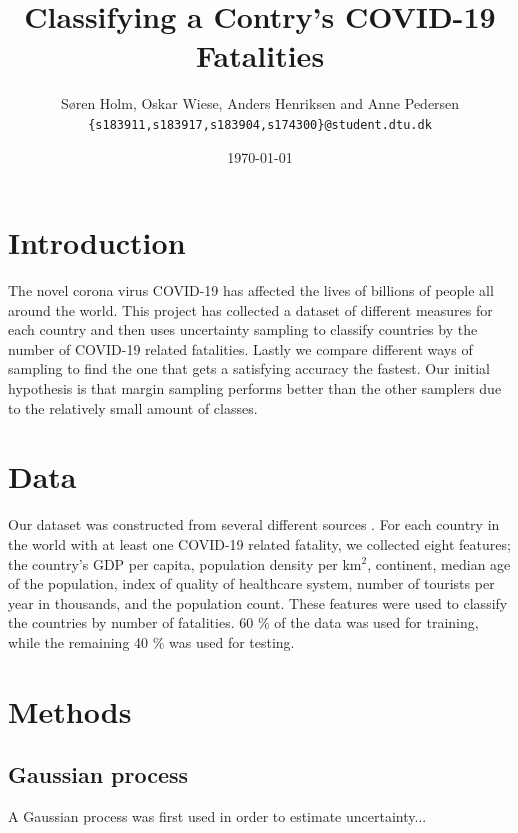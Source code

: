 \documentclass[12pt,fleqn]{article}
\title{\vspace*{-3.75cm}Classifying a Contry's COVID-19 Fatalities}
\author{Søren Holm, Oskar Wiese, Anders Henriksen and Anne Pedersen \\
	\small {\texttt{\{s183911,s183917,s183904,s174300\}@student.dtu.dk}}}
\date{\today}
\begin{document}
	
	\maketitle
	 
	
	\begin{abstract} %
		
	\end{abstract}
	
	\begin{multicols}{2}
		
		
		\section{Introduction} %
		The novel corona virus COVID-19 has affected the lives of billions of people all around the world. This project has collected a dataset of different measures for each country and then uses uncertainty sampling to classify countries by the number of COVID-19 related fatalities. Lastly we compare different ways of sampling to find the one that gets a satisfying accuracy the fastest. Our initial hypothesis is that margin sampling performs better than the other samplers due to the relatively small amount of classes. 
		
		\section{Data} 
		Our dataset was constructed from several different sources \cite{density, corona, alder, bnp, region, healthcare, turist}. For each country in the world with at least one COVID-19 related fatality, we collected eight features; the country's GDP per capita, population density per km$^2$, continent, median age of the population, index of quality of healthcare system, number of tourists per year in thousands, and the population count. These features were used to classify the countries by number of fatalities. 60 \% of the data was used for training, while the remaining 40 \% was used for testing.

		\section{Methods}
		\subsection{Gaussian process} %
		A Gaussian process was first used in order to estimate uncertainty...
		

\end{multicols}
\end{document}
